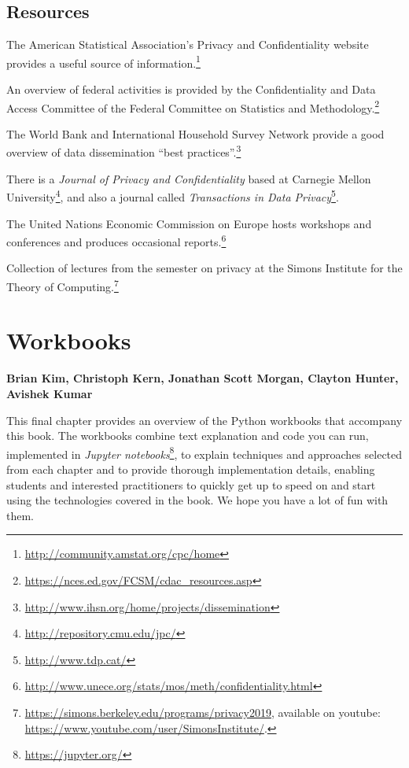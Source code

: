 \documentclass[]{krantz}
\begin{document}
\section{Resources}\label{resources-6}

The American Statistical Association's Privacy and Confidentiality
website provides a useful source of information.\footnote{\url{http://community.amstat.org/cpc/home}}

An overview of federal activities is provided by the Confidentiality and
Data Access Committee of the Federal Committee on Statistics and
Methodology.\footnote{\url{https://nces.ed.gov/FCSM/cdac_resources.asp}}

The World Bank and International Household Survey Network provide a good
overview of data dissemination ``best practices''.\footnote{\url{http://www.ihsn.org/home/projects/dissemination}}

There is a \emph{Journal of Privacy and Confidentiality} based at
Carnegie Mellon University\footnote{\url{http://repository.cmu.edu/jpc/}},
and also a journal called \emph{Transactions in Data Privacy}\footnote{\url{http://www.tdp.cat/}}.

The United Nations Economic Commission on Europe hosts workshops and
conferences and produces occasional reports.\footnote{\url{http://www.unece.org/stats/mos/meth/confidentiality.html}}

Collection of lectures from the semester on privacy at the Simons
Institute for the Theory of Computing.\footnote{\url{https://simons.berkeley.edu/programs/privacy2019},
  available on youtube:
  \url{https://www.youtube.com/user/SimonsInstitute/}.}

\hypertarget{chap:workbooks}{\chapter{Workbooks}\label{chap:workbooks}}

\textbf{Brian Kim, Christoph Kern, Jonathan Scott Morgan, Clayton
Hunter, Avishek Kumar}

This final chapter provides an overview of the Python workbooks that
accompany this book. The workbooks combine text explanation and code you
can run, implemented in \emph{Jupyter notebooks}\footnote{\url{https://jupyter.org/}},
to explain techniques and approaches selected from each chapter and to
provide thorough implementation details, enabling students and
interested practitioners to quickly get up to speed on and start using
the technologies covered in the book. We hope you have a lot of fun with
them.
\end{document}
